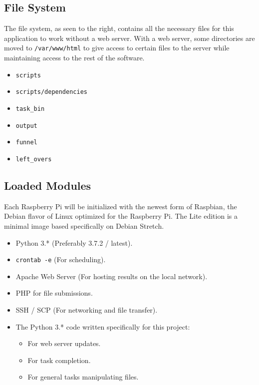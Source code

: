 \documentclass{report}
\begin{document}
\subsection{File System}

\begin{figure}
\end{figure}

The file system, as seen to the right, contains all the necessary files for this application to work without a web server. With a web server, some directories are moved to \verb|/var/www/html| to give access to certain files to the server while maintaining access to the rest of the software.

\begin{itemize}
	\item \verb|scripts|
	\item \verb|scripts/dependencies|
	\item \verb|task_bin|
	\item \verb|output|
	\item \verb|funnel|
	\item \verb|left_overs|
\end{itemize}

\subsection{Loaded Modules}

Each Raspberry Pi will be initialized with the newest form of Raspbian, the Debian flavor of Linux optimized for the Raspberry Pi. The Lite edition is a minimal image based specifically on Debian Stretch.

\begin{itemize}
	\item Python 3.* (Preferably 3.7.2 / latest).
	\item \verb|crontab -e| (For scheduling).
	\item Apache Web Server (For hosting results on the local network).
	\item PHP for file submissions.
	\item SSH / SCP  (For networking and file transfer). 
	\item The Python 3.* code written specifically for this project:
	\begin{itemize}
		\item For web server updates.
		\item For task completion.
		\item For general tasks manipulating files.
	\end{itemize}
\end{itemize}
\end{document}
